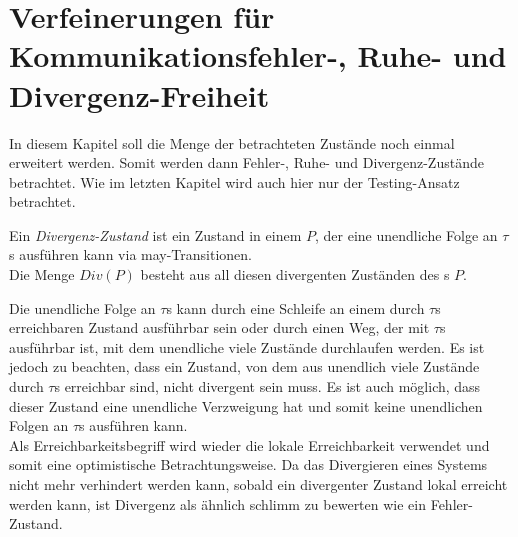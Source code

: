 \chapter{Verfeinerungen für Kommunikationsfehler-, Ruhe- und Divergenz-Freiheit}

In diesem Kapitel soll die Menge der betrachteten Zustände noch einmal
erweitert werden. Somit werden dann Fehler-, Ruhe- und Divergenz-Zustände
betrachtet. Wie im letzten Kapitel wird auch hier nur der Testing-Ansatz
betrachtet.

\begin{Def}[Divergenz]
  Ein \emph{Divergenz-Zustand} ist ein Zustand in einem \MEIO{} $P$, der eine
  unendliche Folge an $\tau$s ausführen kann via may-Transitionen.\\
  Die Menge $Div(P)$ besteht aus all diesen divergenten Zuständen des \MEIO{}s
  $P$.
\end{Def}


Die unendliche Folge an $\tau$s kann durch eine Schleife an einem durch $\tau$s
erreichbaren Zustand ausführbar sein oder durch einen Weg, der mit $\tau$s
ausführbar ist, mit dem unendliche viele Zustände durchlaufen werden. Es ist
jedoch zu beachten, dass ein Zustand, von dem aus unendlich viele Zustände
durch $\tau$s  erreichbar sind, nicht divergent sein muss. Es ist auch möglich,
dass dieser Zustand eine unendliche Verzweigung hat und somit keine unendlichen
Folgen an $\tau$s ausführen kann.\\
Als Erreichbarkeitsbegriff wird wieder die lokale Erreichbarkeit verwendet und
somit eine optimistische Betrachtungsweise. Da das Divergieren eines Systems
nicht mehr verhindert werden kann, sobald ein divergenter Zustand lokal
erreicht werden kann, ist Divergenz als ähnlich \glqq schlimm\grqq{} zu
bewerten wie ein Fehler-Zustand.


